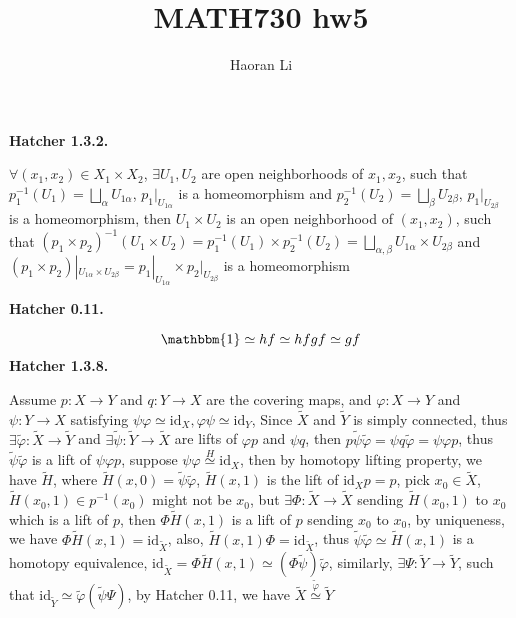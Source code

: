 \documentclass[12pt]{article}
\title{MATH730 hw5}
\author{Haoran Li}
\date{}
\begin{document}
\maketitle
\textbf{Hatcher 1.3.2.} \par
$\forall (x_{1},x_{2})\in X_{1}\times X_{2}$, $\exists U_{1},U_{2}$ are open neighborhoods of $x_{1},x_{2}$, such that $p_{1}^{-1}(U_{1})=\displaystyle\bigsqcup_\alpha U_{1\alpha}$, $p_{1}|_{U_{1\alpha}}$ is a homeomorphism and $p_{2}^{-1}(U_{2})=\displaystyle\bigsqcup_\beta U_{2\beta}$, $p_{1}|_{U_{2\beta}}$ is a homeomorphism, then $U_{1}\times U_{2}$ is an open neighborhood of $(x_{1},x_{2})$, such that $(p_{1}\times p_{2})^{-1}(U_{1}\times U_{2})=p_{1}^{-1}(U_{1})\times p_{2}^{-1}(U_{2})=\displaystyle\bigsqcup_{\alpha,\beta}U_{1\alpha}\times U_{2\beta}$ and $(p_{1}\times p_{2})|_{U_{1\alpha}\times U_{2\beta}}=p_{1}|_{U_{1\alpha}}\times p_{2}|_{U_{2\beta}}$ is a homeomorphism \par
\textbf{Hatcher 0.11.} \par
$$\mathbbm{1}\simeq hf\simeq hfgf\simeq gf$$
\textbf{Hatcher 1.3.8.} \par
Assume $p: X\rightarrow Y$ and $q: Y\rightarrow X$ are the covering maps, and $\varphi: X\rightarrow Y$ and $\psi: Y\rightarrow X$ satisfying $\psi\varphi\simeq\mathrm{id}_X, \varphi\psi\simeq\mathrm{id}_Y$, Since $\widetilde{X}$ and $\widetilde{Y}$ is simply connected, thus $\exists \widetilde{\varphi}: \widetilde{X}\rightarrow \widetilde{Y}$ and $\exists \widetilde{\psi}: \widetilde{Y}\rightarrow \widetilde{X}$ are lifts of $\varphi p$ and $\psi q$, then $p\widetilde{\psi}\widetilde{\varphi}=\psi q\widetilde{\varphi}=\psi\varphi p$, thus $\widetilde{\psi}\widetilde{\varphi}$ is a lift of $\psi\varphi p$, suppose $\psi\varphi\overset{H}{\simeq}\mathrm{id}_X$, then by homotopy lifting property, we have $\widetilde{H}$, where $\widetilde{H}(x,0)=\widetilde{\psi}\widetilde{\varphi}$, $\widetilde{H}(x,1)$ is the lift of $\mathrm{id}_X p=p$, pick $x_0\in\widetilde{X}$, $\widetilde{H}(x_0,1)\in p^{-1}(x_0)$ might not be $x_0$, but $\exists \Phi: \widetilde{X}\rightarrow\widetilde{X}$ sending $\widetilde{H}(x_0,1)$ to $x_0$ which is a lift of $p$, then $\Phi\widetilde{H}(x,1)$ is a lift of $p$ sending $x_0$ to $x_0$, by uniqueness, we have $\Phi\widetilde{H}(x,1)=\mathrm{id}_{\widetilde{X}}$, also, $\widetilde{H}(x,1)\Phi=\mathrm{id}_{\widetilde{X}}$, thus $\widetilde{\psi}\widetilde{\varphi}\simeq\widetilde{H}(x,1)$ is a homotopy equivalence, $\mathrm{id}_{\widetilde{X}}=\Phi\widetilde{H}(x,1)\simeq\left(\Phi\widetilde{\psi}\right)\widetilde{\varphi}$, similarly, $\exists \Psi: \widetilde{Y}\rightarrow \widetilde{Y}$, such that $\mathrm{id}_{\widetilde{Y}}\simeq\widetilde{\varphi}\left(\widetilde{\psi}\Psi\right)$, by Hatcher 0.11, we have $\widetilde{X}\overset{\widetilde{\varphi}}{\simeq}\widetilde{Y}$ \par
\end{document}
